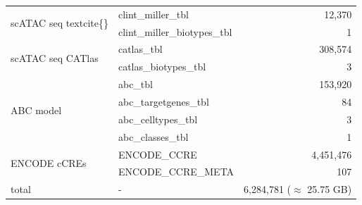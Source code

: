 \begin{table}[h!]
\begin{tabular}{l|l|r}
        \multirow{2}{*}{scATAC seq textcite\{\}}   & clint\_miller\_tbl                 & 12,370                                                                                               \\
                                                   & clint\_miller\_biotypes\_tbl       & 1                                                                                                   \\ \hline
        \multirow{2}{*}{scATAC seq CATlas}         & catlas\_tbl                        & 308,574                                                                                              \\
                                                   & catlas\_biotypes\_tbl              & 3                                                                                                   \\ \hline
        \multirow{4}{*}{ABC model}                 & abc\_tbl                           & 153,920                                                                                              \\
                                                   & abc\_targetgenes\_tbl              & 84                                                                                                  \\
                                                   & abc\_celltypes\_tbl                & 3                                                                                                   \\
                                                   & abc\_classes\_tbl                  & 1                                                                                                   \\ \hline
        \multirow{2}{*}{ENCODE cCREs}              & ENCODE\_CCRE                       & 4,451,476                                                                                             \\
                                                   & ENCODE\_CCRE\_META                 & 107                                                                                                 \\ \hline
        total                                      & -                                  & 6,284,781 ($\approx$ 25.75 GB)
        \end{tabular}
    \end{table}

